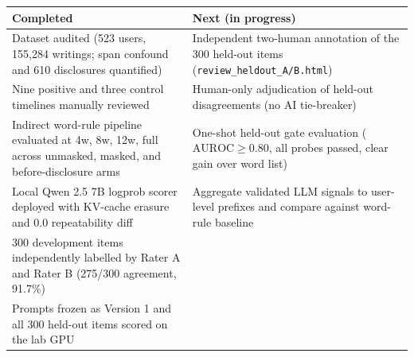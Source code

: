 \documentclass[11pt,a4paper]{article}
\begin{document}
\begin{center}
\begin{tabular}{p{}p{}}
\toprule
\textbf{Completed} & \textbf{Next (in progress)} \\
\midrule
Dataset audited (523 users, 155,284 writings; span confound and 610 disclosures quantified) & Independent two-human annotation of the 300 held-out items (\texttt{review\_heldout\_A/B.html}) \\
Nine positive and three control timelines manually reviewed & Human-only adjudication of held-out disagreements (no AI tie-breaker) \\
Indirect word-rule pipeline evaluated at 4w, 8w, 12w, full across unmasked, masked, and before-disclosure arms & One-shot held-out gate evaluation ($\mathrm{AUROC} \ge 0.80$, all probes passed, clear gain over word list) \\
Local Qwen 2.5 7B logprob scorer deployed with KV-cache erasure and $0.0$ repeatability diff & Aggregate validated LLM signals to user-level prefixes and compare against word-rule baseline \\
300 development items independently labelled by Rater A and Rater B (275/300 agreement, 91.7\%) & \\
Prompts frozen as Version 1 and all 300 held-out items scored on the lab GPU & \\
\bottomrule
\end{tabular}
\end{center}
\end{document}

